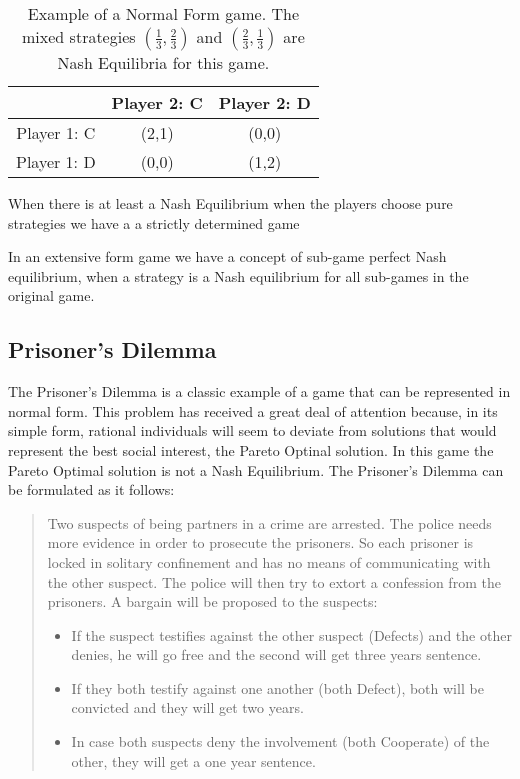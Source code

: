 \begin{center}
\begin{table}[h]
\begin{centering}
\begin{tabular}{ccc}
\hline 
 & Player 2: C & Player 2: D\tabularnewline
\hline 
Player 1: C & (2,1) & (0,0)\tabularnewline
Player 1: D & (0,0) & (1,2)\tabularnewline
\hline 
\end{tabular}
\par\end{centering}

\caption{Example of a Normal Form game. The mixed strategies $(\frac{1}{3} , \frac{2}{3})$ and $(\frac{2}{3} , \frac{1}{3})$ are Nash Equilibria for this game. }
\label{tab:2pennyflip_tab2}
\end{table}
\par\end{center}

When there is at least a Nash Equilibrium when the players choose pure strategies we have a a strictly determined game\cite{Leyton-Brown2008:Essentials_Game_Theory}

In an extensive form game we have a concept of sub-game perfect Nash equilibrium, when a strategy is a Nash equilibrium for all sub-games in the original game\cite{Leyton-Brown2008:Essentials_Game_Theory}.

\subsection{Prisoner's Dilemma}
\label{sebsec:related_work_prisioners_dillama}

The Prisoner's Dilemma is a classic example of a game that can be represented
in normal form\cite{Osborne2004}. This problem has received a great deal of attention
because, in its simple form, rational individuals will seem to deviate
from solutions that would represent the best social interest,
the Pareto Optinal solution. In this game the Pareto Optimal solution
is not a Nash Equilibrium. The Prisoner's Dilemma can be formulated
as it follows:

\begin{quotation}

Two suspects of being partners in a crime are arrested. The police
needs more evidence in order to prosecute the prisoners. So each
prisoner is locked in solitary confinement and has no means of communicating
with the other suspect. The police will then try to extort a confession
from the prisoners. A bargain will be proposed to the suspects:
\begin{itemize}
\item If the suspect testifies against the other suspect (Defects) and the other denies, he will
go free and the second will get three years sentence.
\item If they both testify against one another (both Defect), both will
be convicted and they will get two years.
\item In case both suspects deny the involvement (both Cooperate) of the
other, they will get a one year sentence.
\end{itemize}
\end{quotation}

